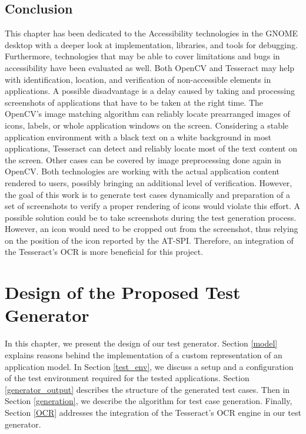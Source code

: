 \section{Conclusion}\label{ocr_conclusion}
This chapter has been dedicated to the Accessibility technologies in the GNOME desktop with a deeper look at implementation, libraries, and tools for debugging. Furthermore, technologies that may be able to cover limitations and bugs in accessibility have been evaluated as well. Both OpenCV and Tesseract may help with identification, location, and verification of non-accessible elements in applications. A possible disadvantage is a delay caused by taking and processing screenshots of applications that have to be taken at the right time. The OpenCV's image matching algorithm can reliably locate prearranged images of icons, labels, or whole application windows on the screen. Considering a stable application environment with a black text on a white background in most applications, Tesseract can detect and reliably locate most of the text content on the screen. Other cases can be covered by image preprocessing done again in OpenCV. Both technologies are working with the actual application content rendered to users, possibly bringing an additional level of verification. However, the goal of this work is to generate test cases dynamically and preparation of a set of screenshots to verify a proper rendering of icons would violate this effort. A possible solution could be to take screenshots during the test generation process. However, an icon would need to be cropped out from the screenshot, thus relying on the position of the icon reported by the AT-SPI. Therefore, an integration of the Tesseract's OCR is more beneficial for this project.

\chapter{Design of the Proposed Test Generator}\label{proposed_solution}
In this chapter, we present the design of our test generator. Section \ref{model} explains reasons behind the implementation of a custom representation of an application model. In Section \ref{test_env}, we discuss a setup and a configuration of the test environment required for the tested applications. Section \ref{generator_output} describes the structure of the generated test cases. Then in Section \ref{generation}, we describe the algorithm for test case generation. Finally, Section \ref{OCR} addresses the integration of the Tesseract's OCR engine in our test generator.

